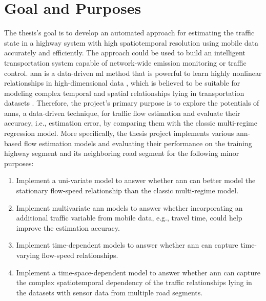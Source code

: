 \documentclass[english]{kththesis}
\begin{document}
\section{Goal and Purposes}
\label{sec:goalAndPurposes}
The thesis's goal is to develop an automated approach for estimating the traffic state in a highway system with high spatiotemporal resolution using mobile data accurately and efficiently. The approach could be used to build an intelligent transportation system capable of network-wide emission monitoring or traffic control. \gls{ann} is a data-driven \gls{ml} method that is powerful to learn highly nonlinear relationships in high-dimensional data \cite{ma_lstm_predict}, which is believed to be suitable for modeling complex temporal and spatial relationships lying in transportation datasets \cite{vlahogianni_forecast_overview}. Therefore, the project's primary purpose is to explore the potentials of \glspl{ann}, a data-driven technique, for traffic flow estimation and evaluate their accuracy, i.e., estimation error, by comparing them with the classic multi-regime regression model. More specifically, the thesis project implements various \gls{ann}-based flow estimation models and evaluating their performance on the training highway segment and its neighboring road segment for the following minor purposes:
\begin{enumerate}
    \item Implement a uni-variate model to answer whether \gls{ann} can better model the stationary flow-speed relationship than the classic multi-regime model.
    \item Implement multivariate \gls{ann} models to answer whether incorporating an additional traffic variable from mobile data, e.g., travel time, could help improve the estimation accuracy.
    \item Implement time-dependent models to answer whether \gls{ann} can capture time-varying flow-speed relationships.
    \item Implement a time-space-dependent model to answer whether \gls{ann} can capture the complex spatiotemporal dependency of the traffic relationships lying in the datasets with sensor data from multiple road segments.
\end{enumerate}
\end{document}
